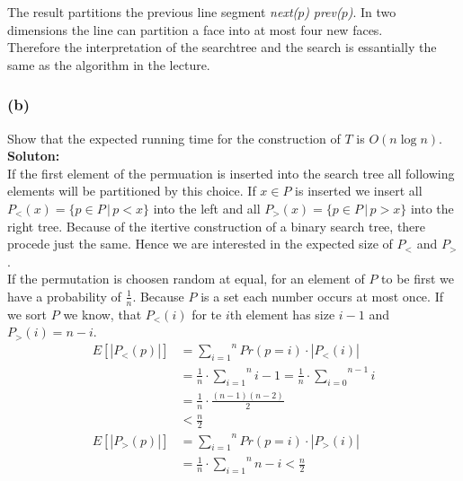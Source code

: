 \documentclass[11pt,a4paper,ngerman]{article}
\begin{document}
The result partitions the previous line segment \emph{next($p$)} \emph{prev($p$)}. In two dimensions the line
can partition a face into at most four new faces.\\

Therefore the interpretation of the searchtree and the search is essantially the same as the algorithm in the lecture.

\subsubsection*{(b)}

Show that the expected running time for the construction of $T$ is $O(n \log n)$.\\

\textbf{Soluton:}\\

If the first element of the permuation is inserted into the search tree all following elements will be partitioned by
this choice. If $x \in P$ is inserted we insert all $P_<(x) = \{ p \in P \, | \, p < x \}$ into the left and
all $P_>(x) = \{ p \in P \, | \, p > x \}$ into the right tree. Because of the itertive construction of a binary search tree,
there procede just the same. Hence we are interested in the expected size of $P_<$ and $P_>$.\\

If the permutation is choosen random at equal, for an element of $P$ to be first we have a probability of $\frac{1}{n}$.
Because $P$ is a set each number occurs at most once. If we sort $P$ we know, that $P_<(i)$ for te $i$th element
has size $i-1$ and $P_>(i) = n-i$.
\begin{equation*}\begin{split}
    E[|P_<(p)|] &= \overset{n}{\underset{i=1}{\sum}} Pr(p = i) \cdot |P_<(i)|\\
                &= \frac{1}{n} \cdot \overset{n}{\underset{i=1}{\sum}} i-1
                = \frac{1}{n} \cdot \overset{n-1}{\underset{i=0}{\sum}} i\\
                &= \frac{1}{n} \cdot \frac{(n-1)(n-2)}{2}\\
                &< \frac{n}{2}\\
    E[|P_>(p)|] &= \overset{n}{\underset{i=1}{\sum}} Pr(p=i) \cdot |P_>(i)|\\
                &= \frac{1}{n} \cdot \overset{n}{\underset{i=1}{\sum}} n-i
                < \frac{n}{2}
\end{split}\end{equation*}
\end{document}
